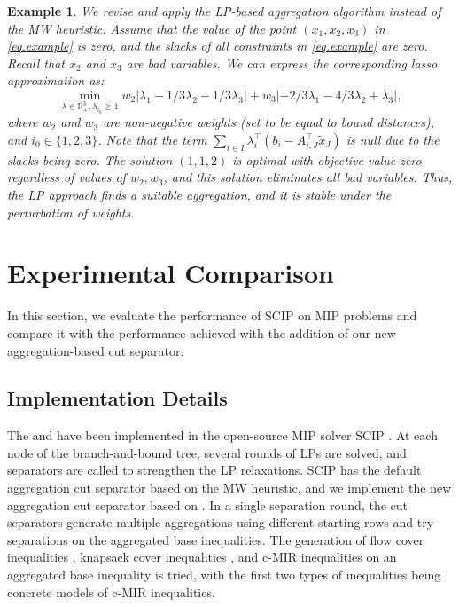 \documentclass[a4paper,UKenglish,cleveref, autoref,  thm-restate]{lipics-v2021}
\newcommand{\bR}{\mathbb{R}}
\newcommand{\relx}[1]{\tilde{#1}}
\newtheorem{example}{Example}
\begin{document}
	
	\begin{example}
		We revise  and apply the LP-based aggregation algorithm instead of the MW heuristic. Assume that the value of the point $(x_1,x_2,x_3)$ in \eqref{eq.example} is zero, and the slacks of all constraints in \eqref{eq.example}  are zero. Recall that $x_2$ and $x_3$ are bad variables. We can express the corresponding lasso approximation as:
		\begin{equation}
			\min_{\lambda \in \bR^3_+, \lambda_{i_0} \ge 1} w_2|\lambda_1 - 1/3 \lambda_2  - 1/3 \lambda_3 | + w_3 |-2/3\lambda_1 - 4/3 \lambda_2  + \lambda_3 |,
		\end{equation}
		where $w_2$ and $w_3$ are non-negative weights (set to be equal to bound distances), and $i_0 \in \{1,2,3\}$. Note that the term $\sum_{i \in I}\lambda^\top_i (b_i - A_{i,J}^\top \relx{x}_J)$  is null due to the slacks being zero. The solution $(1,1,2)$ is optimal with objective value zero regardless of values of $w_2,w_3$, and this solution eliminates all bad variables. Thus, the LP approach finds a suitable aggregation, and it is stable under the perturbation of weights.
	\end{example}
	
	
	
	
	
	
	
	
	\section{Experimental Comparison} \label{sec.exper}
	In this section, we evaluate the performance of SCIP on MIP problems and compare it with the performance achieved with the addition of our new aggregation-based cut separator.
	\subsection{Implementation Details}
	The   and  have been implemented in the open-source MIP solver SCIP \cite{bolusani2024scipoptimizationsuite90}.  At each node of the branch-and-bound tree, several rounds of LPs are solved, and separators are called to strengthen the LP relaxations. SCIP has the default aggregation cut separator based on the MW heuristic, and we implement the new aggregation cut separator based on  .
	In a single separation round, the cut separators generate multiple aggregations using different starting rows and try separations on the aggregated base inequalities. The generation of flow cover inequalities \cite{gu1999lifted}, knapsack cover inequalities \cite{letchford2019lifted}, and c-MIR inequalities on an aggregated base inequality is tried, with the first two types of inequalities being concrete models of c-MIR inequalities.
	
\end{document}
